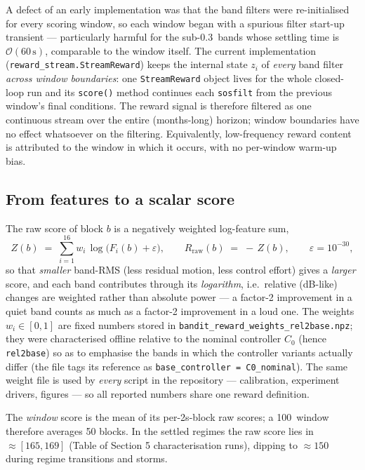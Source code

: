 \documentclass[11pt,a4paper]{article}
\newcommand{\SI}[2]{#1\,\text{#2}}
\newcommand{\code}[1]{\texttt{#1}}
\begin{document}
A defect of an early implementation was that the band filters were re-initialised for
every scoring window, so each window began with a spurious filter start-up transient ---
particularly harmful for the sub-\SI{0.3}{Hz} bands whose settling time is
$\mathcal O(\SI{60}{s})$, comparable to the window itself. The current implementation
(\code{reward\_stream.StreamReward}) keeps the internal state $z_i$ of \emph{every} band
filter \emph{across window boundaries}: one \code{StreamReward} object lives for the
whole closed-loop run and its \code{score()} method continues each \code{sosfilt} from
the previous window's final conditions. The reward signal is therefore filtered as one
continuous stream over the entire (months-long) horizon; window boundaries have no
effect whatsoever on the filtering. Equivalently, low-frequency reward content is
attributed to the window in which it occurs, with no per-window warm-up bias.

\subsection{From features to a scalar score}

The raw score of block $b$ is a negatively weighted log-feature sum,
\begin{equation}
  \label{eq:raw}
  Z(b) \;=\; \sum_{i=1}^{16} w_i \,\log\!\big(F_i(b) + \varepsilon\big),
  \qquad
  R_{\mathrm{raw}}(b) \;=\; -\,Z(b), \qquad \varepsilon = 10^{-30},
\end{equation}
so that \emph{smaller} band-RMS (less residual motion, less control effort) gives a
\emph{larger} score, and each band contributes through its \emph{logarithm}, i.e.\
relative (dB-like) changes are weighted rather than absolute power --- a factor-2
improvement in a quiet band counts as much as a factor-2 improvement in a loud one. The
weights $w_i \in [0,1]$ are fixed numbers stored in
\code{bandit\_reward\_weights\_rel2base.npz}; they were characterised offline relative to
the nominal controller $C_0$ (hence \code{rel2base}) so as to emphasise the bands in
which the controller variants actually differ (the file tags its reference as
\code{base\_controller = C0\_nominal}). The same weight file is used by \emph{every}
script in the repository --- calibration, experiment drivers, figures --- so all reported
numbers share one reward definition.

The \emph{window} score is the mean of its per-2s-block raw scores; a \SI{100}{s} window
therefore averages 50 blocks. In the settled regimes the raw score lies in
$\approx[165, 169]$ (Table of Section 5 characterisation runs), dipping to
$\approx 150$ during regime transitions and storms.
\end{document}
